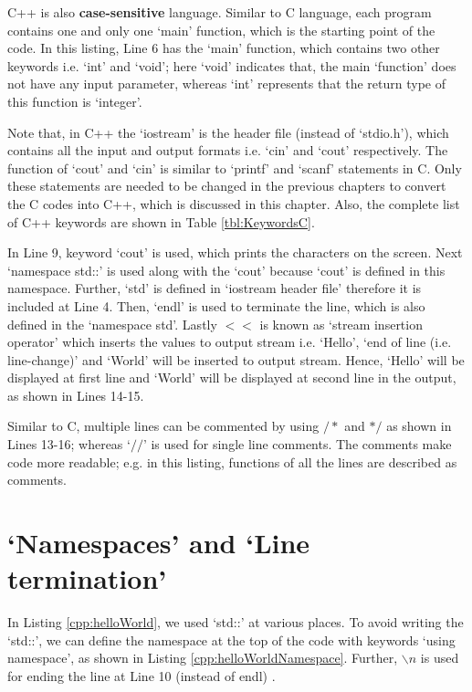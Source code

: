 \begin{explanation}
	C++ is also \textbf{case-sensitive} language. Similar to C language, each program contains one and only one  `main' function, which is the starting point of the code. In this listing, Line 6 has the `main' function, which contains two other keywords i.e. `int' and `void'; here `void' indicates that, the main `function' does not have any input parameter, whereas `int' represents that the return type of this function is `integer'.
	
	\begin{noNumBox}
		Note that, in C++ the `iostream' is the header file (instead of `stdio.h'), which contains all the input and output formats i.e. `cin' and `cout' respectively. The function of `cout' and `cin' is similar to `printf' and `scanf' statements in C. Only these statements are needed to be changed in the previous chapters to convert the C codes into C++, which is discussed in this chapter. Also, the complete list of C++ keywords are shown in Table \ref{tbl:KeywordsC}. 
	\end{noNumBox}
		
	In Line 9, keyword `cout' is used, which prints the characters on the screen. Next `namespace std::' is used along with the `cout' because `cout' is defined in this namespace. Further, `std' is defined in `iostream header file' therefore it is included at Line 4. Then, `endl' is used to terminate the line, which is also defined in the `namespace std'. Lastly $<<$ is known as `stream insertion operator' which inserts the values to output stream i.e. `Hello', `end of line (i.e. line-change)' and `World' will be inserted to output stream. Hence, `Hello' will be displayed at first line and `World' will be displayed at second line in the output, as shown in Lines 14-15. 
	
	Similar to C,  multiple lines can be commented by using $/ *$ and $* /$ as shown in Lines 13-16; whereas `$//$' is used for single line comments. The comments make code more readable; e.g. in this listing, functions of all the lines are described as comments.
\end{explanation}

  

\section{`Namespaces' and `Line termination' }
In Listing \ref{cpp:helloWorld}, we used `std::' at various places. To avoid writing the `std::', we can define the  namespace at the top of the code with keywords `using namespace', as shown in Listing \ref{cpp:helloWorldNamespace}. Further, $\backslash n$ is used for ending the line at Line 10 (instead of endl) .

